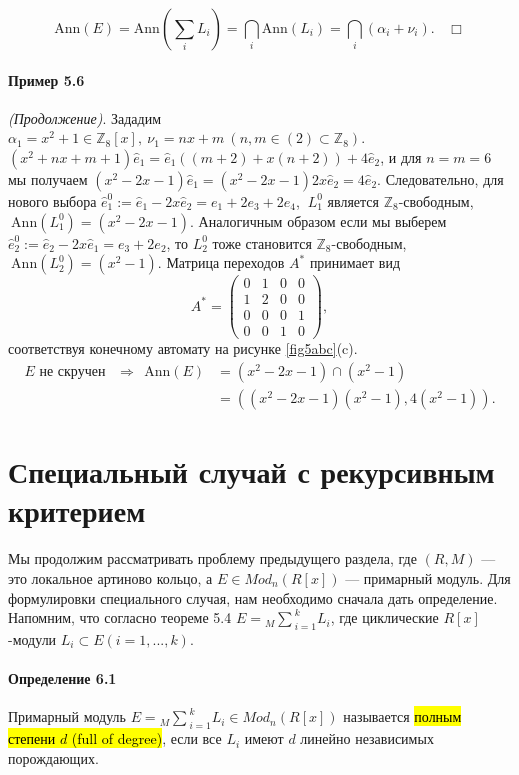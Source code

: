 \documentclass[a4paper,12pt]{article}
\newcommand{\dirsummod}[1]{{_{{#1}}\!\!\sum}}
\newcommand{\hatei}[1]{\hat{e}_{#1}}
\newcommand{\Ann}{\text{Ann}}
\begin{document}
$$
\Ann(E) = \Ann\left(\sum_i L_i \right) = \bigcap_i \Ann(L_i) = \bigcap_i (\alpha_i + \nu_i). ~~~~ \Box
$$

\paragraph{Пример 5.6} \textit{(Продолжение)}.
Зададим $\alpha_1 = x^2 + 1 \in \mathbb{Z}_8[x],~ \nu_1 = nx + m ~ (n, m \in (2) \subset \mathbb{Z}_8)$. $(x^2 + nx + m + 1)\hatei{1} = \hatei{1} ((m+2) + x(n+2)) + 4 \hatei{2}$, и для $n = m = 6$ мы получаем $(x^2 - 2x - 1)\hatei{1} = (x^2 - 2x - 1) 2x \hatei{2} = 4 \hatei{2}$. Следовательно, для нового выбора $\hatei{1}^0 := \hatei{1} - 2 x \hatei{2} = e_1 + 2 e_3 + 2 e_4$, $~L_1^0$ является $\mathbb{Z}_8$-свободным, $~\Ann(L_1^0) = (x^2 - 2x - 1)$. Аналогичным образом если мы выберем $\hatei{2}^0 := \hatei{2} - 2x \hatei{1} = e_3 + 2 e_2$, то $L_2^0$ тоже становится $\mathbb{Z}_8$-свободным, $~\Ann(L_2^0) = (x^2 - 1)$. Матрица переходов $A^*$ принимает вид $$ A^* = \begin{pmatrix}
	0 & 1 & 0 & 0 \\
	1 & 2 & 0 & 0 \\
	0 & 0 & 0 & 1 \\
	0 & 0 & 1 & 0
\end{pmatrix},$$ соответствуя конечному автомату на рисунке \ref{fig5abc}(c).
$$
\begin{aligned}
E \text{ не скручен } ~~ \Rightarrow ~~ \Ann(E) & = (x^2 - 2x -1) \cap (x^2 - 1) \\
& = ((x^2 - 2x -1)(x^2 - 1), 4(x^2 - 1)).
\end{aligned}
$$

\section{Специальный случай с рекурсивным критерием}

Мы продолжим рассматривать проблему предыдущего раздела, где $(R, M)$ --- это локальное артиново кольцо, а $E \in Mod_n (R[x])$ --- примарный модуль. Для формулировки специального случая, нам необходимо сначала дать определение. Напомним, что согласно теореме 5.4 $E = \dirsummod{M}_{i=1}^k L_i$, где циклические $R[x]$-модули $L_i \subset E (i = 1, ..., k)$.


\paragraph{Определение 6.1}
Примарный модуль $E = \dirsummod{M}_{i=1}^k L_i \in Mod_n (R[x])$ называется \hl{полным степени $d$ (full of degree)}, если все $L_i$ имеют $d$ линейно независимых порождающих. \\
\end{document}
